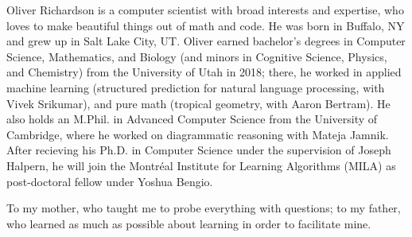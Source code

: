 \documentclass[tocprelim,
    ]{cornellmodified}
\begin{document}
\begin{biosketch}
Oliver Richardson is a computer scientist 
    with broad interests and expertise,
    who loves to make beautiful things out of math and code.
He was born in Buffalo, NY and grew up in Salt Lake City, UT. 
Oliver earned bachelor's degrees in Computer Science, Mathematics, and Biology 
    (and minors in Cognitive Science, Physics, and Chemistry)
    from the University of Utah in 2018;
    there, he worked in applied machine learning 
        (structured prediction for natural language processing, with Vivek Srikumar),
    and pure math 
        (tropical geometry, with Aaron Bertram). 
He also holds an M.Phil. in Advanced Computer Science from the University of Cambridge, where he worked on diagrammatic reasoning with Mateja Jamnik. 
%
After recieving his Ph.D. in Computer Science under the supervision of Joseph Halpern, he will join the Montr\'{e}al Institute for Learning Algorithms (MILA) as post-doctoral fellow under Yoshua Bengio.
\end{biosketch}

\begin{dedication}
To my mother, 
    who taught me to probe everything with questions;
to my father,
    who learned as much as possible about learning in order to facilitate mine.
\end{dedication}

\begin{acknowledgements}



\end{acknowledgements}

\contentspage
\figurelistpage

\normalspacing \setcounter{page}{1} 
\pagestyle{cornell} \addtolength{\parskip}{0.5\baselineskip}
\end{document}
